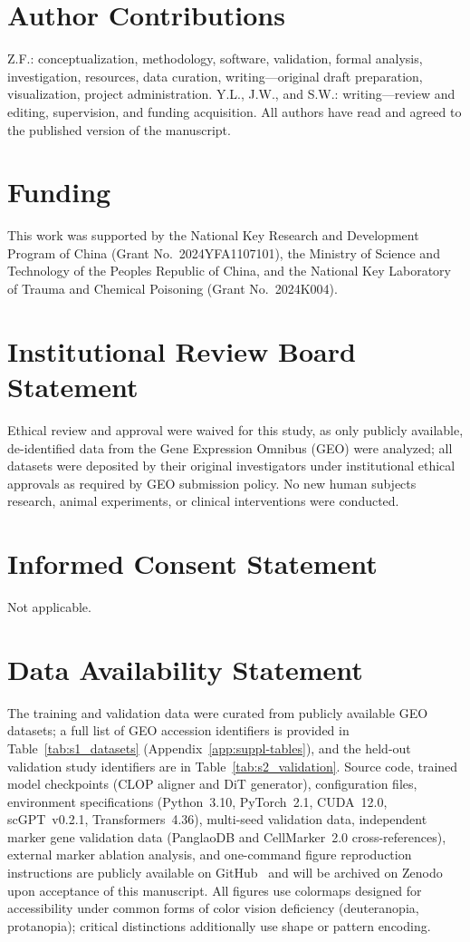 \documentclass[11pt,a4paper]{article}
\newcommand{\authorcontributions}[1]{\section*{Author Contributions}#1}
\newcommand{\funding}[1]{\section*{Funding}#1}
\newcommand{\institutionalreview}[1]{\section*{Institutional Review Board Statement}#1}
\newcommand{\informedconsent}[1]{\section*{Informed Consent Statement}#1}
\newcommand{\dataavailability}[1]{\section*{Data Availability Statement}#1}
\begin{document}
\authorcontributions{Z.F.: conceptualization, methodology, software, validation, formal analysis, investigation, resources, data curation, writing---original draft preparation, visualization, project administration. Y.L., J.W., and S.W.: writing---review and editing, supervision, and funding acquisition. All authors have read and agreed to the published version of the manuscript.}

\funding{This work was supported by the National Key Research and Development Program of China (Grant No.~2024YFA1107101), the Ministry of Science and Technology of the People\textquotesingle s Republic of China, and the National Key Laboratory of Trauma and Chemical Poisoning (Grant No.~2024K004).}

\institutionalreview{Ethical review and approval were waived for this study, as only publicly available, de-identified data from the Gene Expression Omnibus (GEO) were analyzed; all datasets were deposited by their original investigators under institutional ethical approvals as required by GEO submission policy. No new human subjects research, animal experiments, or clinical interventions were conducted.}

\informedconsent{Not applicable.}

\dataavailability{The training and validation data were curated from publicly available GEO datasets; a full list of GEO accession identifiers is provided in Table~\ref{tab:s1_datasets} (Appendix~\ref{app:suppl-tables}), and the held-out validation study identifiers are in Table~\ref{tab:s2_validation}. Source code, trained model checkpoints (CLOP aligner and DiT generator), configuration files, environment specifications (Python~3.10, PyTorch~2.1, CUDA~12.0, scGPT~v0.2.1, Transformers~4.36), multi-seed validation data, independent marker gene validation data (PanglaoDB and CellMarker~2.0 cross-references), external marker ablation analysis, and one-command figure reproduction instructions are publicly available on GitHub~\cite{ref-clop-dit} and will be archived on Zenodo upon acceptance of this manuscript. All figures use colormaps designed for accessibility under common forms of color vision deficiency (deuteranopia, protanopia); critical distinctions additionally use shape or pattern encoding.}

\end{document}
